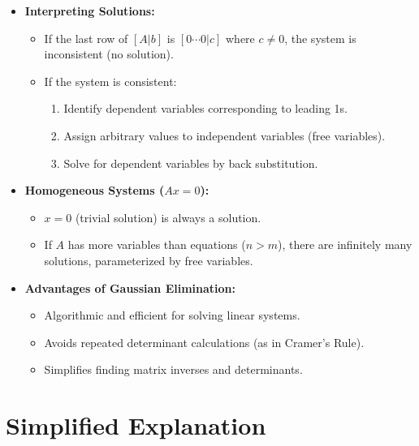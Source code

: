 \documentclass{article}
\begin{document}
\begin{itemize}
  \item \textbf{Interpreting Solutions:}
    \begin{itemize}
      \item If the last row of $[A|b]$ is $[0 \cdots 0 | c]$ where $c \neq 0$, the system is inconsistent (no solution).
      \item If the system is consistent:
        \begin{enumerate}
          \item Identify dependent variables corresponding to leading 1s.
          \item Assign arbitrary values to independent variables (free variables).
          \item Solve for dependent variables by back substitution.
        \end{enumerate}
    \end{itemize}

  \item \textbf{Homogeneous Systems ($Ax = 0$):}
    \begin{itemize}
      \item $x = 0$ (trivial solution) is always a solution.
      \item If $A$ has more variables than equations ($n > m$), there are infinitely many solutions, parameterized by free variables.
    \end{itemize}

  \item \textbf{Advantages of Gaussian Elimination:}
    \begin{itemize}
      \item Algorithmic and efficient for solving linear systems.
      \item Avoids repeated determinant calculations (as in Cramer’s Rule).
      \item Simplifies finding matrix inverses and determinants.
    \end{itemize}
\end{itemize}

\section*{Simplified Explanation}
\end{document}
